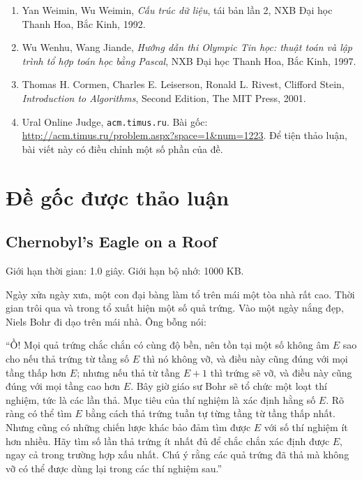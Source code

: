 \documentclass[11pt]{article}
\begin{document}
\begin{enumerate}
  \item Yan Weimin, Wu Weimin, \emph{Cấu trúc dữ liệu}, tái bản lần 2, NXB
  Đại học Thanh Hoa, Bắc Kinh, 1992.
  \item Wu Wenhu, Wang Jiande, \emph{Hướng dẫn thi Olympic Tin học: thuật toán
  và lập trình tổ hợp toán học bằng Pascal}, NXB Đại học Thanh Hoa, Bắc Kinh,
  1997.
  \item Thomas H. Cormen, Charles E. Leiserson, Ronald L. Rivest, Clifford
  Stein, \emph{Introduction to Algorithms}, Second Edition, The MIT Press,
  2001.
  \item Ural Online Judge, \texttt{acm.timus.ru}. Bài gốc:
  \url{http://acm.timus.ru/problem.aspx?space=1&num=1223}. Để tiện thảo luận,
  bài viết này có điều chỉnh một số phần của đề.
\end{enumerate}

\appendix

\section{Đề gốc được thảo luận}

\subsection*{Chernobyl's Eagle on a Roof}

Giới hạn thời gian: 1.0 giây. Giới hạn bộ nhớ: 1000 KB.

Ngày xửa ngày xưa, một con đại bàng làm tổ trên mái một tòa nhà rất cao. Thời
gian trôi qua và trong tổ xuất hiện một số quả trứng. Vào một ngày nắng đẹp,
Niels Bohr đi dạo trên mái nhà. Ông bỗng nói:

``Ồ! Mọi quả trứng chắc chắn có cùng độ bền, nên tồn tại một số không âm $E$
sao cho nếu thả trứng từ tầng số $E$ thì nó không vỡ, và điều này cũng đúng
với mọi tầng thấp hơn $E$; nhưng nếu thả từ tầng $E+1$ thì trứng sẽ vỡ, và
điều này cũng đúng với mọi tầng cao hơn $E$. Bây giờ giáo sư Bohr sẽ tổ chức
một loạt thí nghiệm, tức là các lần thả. Mục tiêu của thí nghiệm là xác định
hằng số $E$. Rõ ràng có thể tìm $E$ bằng cách thả trứng tuần tự từng tầng từ
tầng thấp nhất. Nhưng cũng có những chiến lược khác bảo đảm tìm được $E$ với
số thí nghiệm ít hơn nhiều. Hãy tìm số lần thả trứng ít nhất đủ để chắc chắn
xác định được $E$, ngay cả trong trường hợp xấu nhất. Chú ý rằng các quả
trứng đã thả mà không vỡ có thể được dùng lại trong các thí nghiệm sau.''
\end{document}
